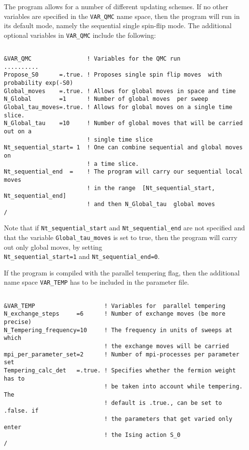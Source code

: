 The program allows for a number of different  updating schemes.  If no other variables are specified in the \texttt{VAR\_QMC} name space, then the program will run in its default mode, namely the sequential single spin-flip mode.   The additional optional variables in   \texttt{VAR\_QMC}   include the following: 
\lstset{style=fortran}
\begin{lstlisting} 

&VAR_QMC                ! Variables for the QMC run 
..........
Propose_S0      =.true. ! Proposes single spin flip moves  with probability exp(-S0) 
Global_moves    =.true. ! Allows for global moves in space and time 
N_Global        =1      ! Number of global moves  per sweep 
Global_tau_moves=.true. ! Allows for global moves on a single time slice.  
N_Global_tau    =10     ! Number of global moves that will be carried out on a 
                        ! single time slice
Nt_sequential_start= 1  ! One can combine sequential and global moves on 
                        ! a time slice.  
Nt_sequential_end  =    ! The program will carry our sequential local moves  
                        ! in the range  [Nt_sequential_start, Nt_sequential_end] 
                        ! and then N_Global_tau  global moves
/   
\end{lstlisting}
Note that if \texttt{Nt\_sequential\_start}  and \texttt{Nt\_sequential\_end}  are not specified and that the variable \texttt{Global\_tau\_moves}  is set to true, then  the program will  carry out only global moves, by setting  \\  \texttt{Nt\_sequential\_start=1}  and \texttt{Nt\_sequential\_end=0}. 


If the program is compiled with the parallel tempering flag, then the additional name space \texttt{VAR\_TEMP}   has to be included in the parameter file.
\lstset{style=fortran}
\begin{lstlisting} 

&VAR_TEMP                    ! Variables for  parallel tempering
N_exchange_steps     =6      ! Number of exchange moves (be more precise)
N_Tempering_frequency=10     ! The frequency in units of sweeps at which  
                             ! the exchange moves will be carried 
mpi_per_parameter_set=2      ! Number of mpi-processes per parameter set
Tempering_calc_det   =.true. ! Specifies whether the fermion weight has to
                             ! be taken into account while tempering. The
                             ! default is .true., can be set to .false. if
                             ! the parameters that get varied only enter 
                             ! the Ising action S_0
/
\end{lstlisting}




